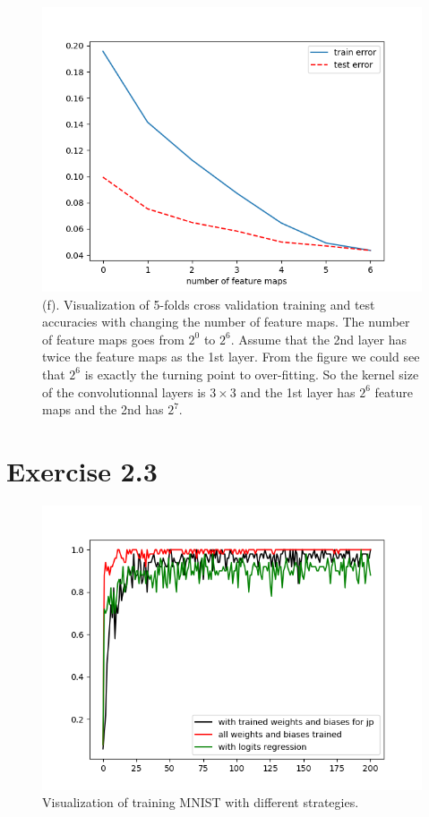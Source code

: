 \documentclass[11pt]{article} %
\begin{document}
\begin{figure}[htb]
  \centering
  \centerline{\includegraphics[width=1\textwidth ]{feature_map.png}}
  \vspace{-5pt}
    \centering
\caption{(f). Visualization of 5-folds cross validation training and test accuracies with changing the number of feature maps. The number of feature maps goes from $2^{0}$ to $2^{6}$. Assume that the 2nd layer has twice the feature maps as the 1st layer. From the figure we could see that $2^{6}$ is exactly the turning point to over-fitting. So the kernel size of the convolutionnal layers is $3 \times 3$ and the 1st layer has $2^{6}$ feature maps and the 2nd has $2^{7}$.}
\vspace{-1pt}
\end{figure}
\clearpage

\section*{Exercise 2.3}

\begin{figure}[htb]
  \centering
  \centerline{\includegraphics[width=1\textwidth ]{Figure_3.png}}
  \vspace{-5pt}
    \centering
\caption{Visualization of training MNIST with different strategies.}
\vspace{-1pt}
\end{figure}
\clearpage
\end{document}
